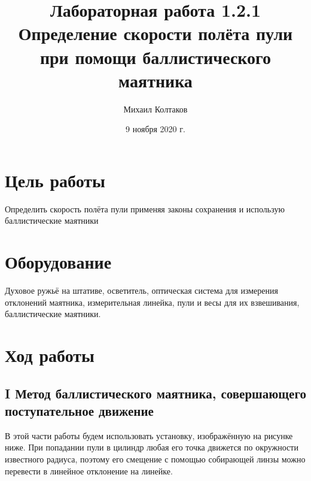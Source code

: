 \documentclass[a4paper, 12pt]{article}
\title{Лабораторная работа 1.2.1 Определение скорости полёта пули при помощи баллистического маятника}
\author{Михаил Колтаков}
\date{9 ноября 2020 г.}
\begin{document}
	\maketitle
	\section*{Цель работы}
		Определить скорость полёта пули применяя законы сохранения и использую баллистические маятники
	\section*{Оборудование}
		Духовое ружьё на штативе, осветитель, оптическая система для измерения отклонений маятника, измерительная линейка, пули и весы для их взвешивания, баллистические маятники.
	\section*{Ход работы}
		\subsection*{I Метод баллистического маятника, совершающего поступательное движение}
			В этой части работы будем использовать установку, изображённую на рисунке ниже. При попадании пули в цилиндр любая его точка движется по окружности известного радиуса, поэтому его смещение с помощью собирающей линзы можно перевести в линейное отклонение на линейке.
			\begin{figure}[h]
			\end{figure}
		
\end{document}
